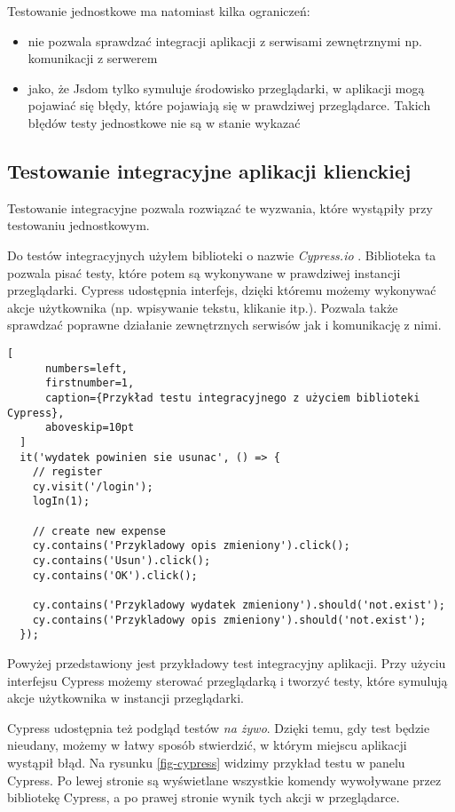 Testowanie jednostkowe ma natomiast kilka ograniczeń:
\begin{itemize}
  \item nie pozwala sprawdzać integracji aplikacji z serwisami zewnętrznymi np. komunikacji z serwerem
  \item jako, że Jsdom tylko symuluje środowisko przeglądarki, w aplikacji mogą pojawiać się błędy, które pojawiają się w prawdziwej przeglądarce. Takich błędów testy jednostkowe nie są w stanie wykazać
\end{itemize}

\subsection{Testowanie integracyjne aplikacji klienckiej}
Testowanie integracyjne pozwala rozwiązać te wyzwania, które wystąpiły przy testowaniu jednostkowym.

Do testów integracyjnych użyłem biblioteki o nazwie \emph{Cypress.io} \cite{ref_cypress_doc}. Biblioteka ta pozwala pisać testy, które potem są wykonywane w prawdziwej instancji przeglądarki. Cypress udostępnia interfejs, dzięki któremu możemy wykonywać akcje użytkownika (np. wpisywanie tekstu, klikanie itp.). Pozwala także sprawdzać poprawne działanie zewnętrznych serwisów jak i komunikację z nimi.

  \begin{addmargin}[6mm]{0mm}
  \begin{lstlisting}[
      numbers=left,
      firstnumber=1,
      caption={Przykład testu integracyjnego z użyciem biblioteki Cypress},
      aboveskip=10pt
  ]
  it('wydatek powinien sie usunac', () => {
    // register
    cy.visit('/login');
    logIn(1);

    // create new expense
    cy.contains('Przykladowy opis zmieniony').click();
    cy.contains('Usun').click();
    cy.contains('OK').click();

    cy.contains('Przykladowy wydatek zmieniony').should('not.exist');
    cy.contains('Przykladowy opis zmieniony').should('not.exist');
  });
  \end{lstlisting}
  \end{addmargin}
  Powyżej przedstawiony jest przykładowy test integracyjny aplikacji. Przy użyciu interfejsu Cypress możemy sterować przeglądarką i tworzyć testy, które symulują akcje użytkownika w instancji przeglądarki.

Cypress udostępnia też podgląd testów \emph{na żywo}. Dzięki temu, gdy test będzie nieudany, możemy w łatwy sposób stwierdzić, w którym miejscu aplikacji wystąpił błąd. Na rysunku \ref{fig-cypress} widzimy przykład testu w panelu Cypress. Po lewej stronie są wyświetlane wszystkie komendy wywoływane przez bibliotekę Cypress, a po prawej stronie wynik tych akcji w przeglądarce.

